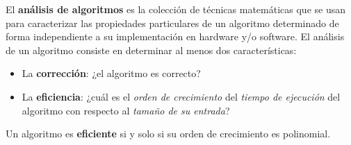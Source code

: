 El \textbf{análisis de algoritmos} es la colección de técnicas matemáticas que se usan para caracterizar las propiedades particulares de un algoritmo determinado de forma independiente a su implementación en hardware y/o software. 
El análisis de un algoritmo consiste en determinar al menos dos características:
\begin{itemize}
  \item La \textbf{corrección}: ¿el algoritmo es correcto?
  \item La \textbf{eficiencia}: ¿cuál es el \emph{orden de crecimiento} del 
  \emph{tiempo de ejecución} del algoritmo con respecto al \emph{tamaño de su entrada}?
\end{itemize}
Un algoritmo es \textbf{eficiente} si y solo si su orden de crecimiento es polinomial.


